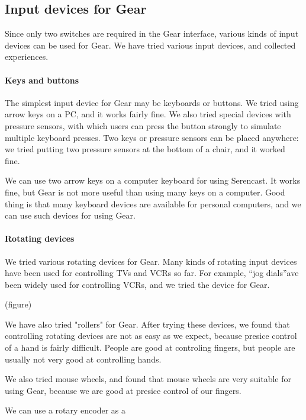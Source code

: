 \documentclass{article}
\def\SC{\textsf{\small Serencast}}
\begin{document}
\subsection{Input devices for Gear}

Since only two switches are required in the Gear interface,
various kinds of input devices can be used for Gear.
We have tried various input devices, and collected experiences.

\paragraph{Keys and buttons}

The simplest input device for Gear may be keyboards or buttons.
We tried using arrow keys on a PC, and it works fairly fine.
We also tried special devices with pressure sensors, with which users can press the button strongly to simulate multiple keyboard presses.
Two keys or pressure sensors can be placed anywhere: we tried putting two pressure sensors at the bottom of a chair, and it worked fine.

We can use two arrow keys on a computer keyboard for using {\SC}.
It works fine, but Gear is not more useful than using many keys on a computer.
%
Good thing is that many keyboard devices are available for personal computers,
and we can use such devices for using Gear.


\paragraph{Rotating devices}

We tried various rotating devices for Gear.
Many kinds of rotating input devices have been used for controlling TVs and VCRs so far.
For example, ``jog dials''ave been widely used for controlling VCRs, and we tried the device for Gear.

(figure)

We have also tried "rollers" for Gear.
After trying these devices, we found that controlling rotating devices are not as easy as we expect,
because presice control of a hand is fairly difficult.
People are good at controling fingers, but people are usually not very good at controlling hands.

We also tried mouse wheels, and found that mouse wheels are very suitable for using Gear, because
we are good at presice control of our fingers.


We can use a rotary encoder as a 
\end{document}
